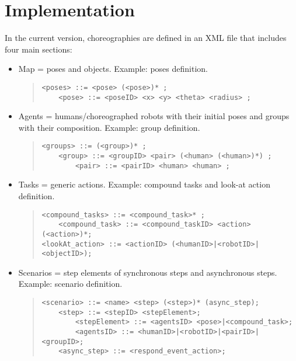 \section{Implementation}
\label{sec:implementation}
In the current version, choreographies are defined in an XML file that includes four main sections:
\begin{itemize}
    \item Map = poses and objects. Example: poses definition.
    {\footnotesize
        \begin{quote}
        \begin{verbatim}
<poses> ::= <pose> (<pose>)* ;
    <pose> ::= <poseID> <x> <y> <theta> <radius> ;
        \end{verbatim}
        \end{quote}
    }
    \item Agents = humans/choreographed robots with their initial poses and groups with their composition. Example: group definition.
    {\footnotesize
        \begin{quote}
        \begin{verbatim}
<groups> ::= (<group>)* ; 
    <group> ::= <groupID> <pair> (<human> (<human>)*) ;
        <pair> ::= <pairID> <human> <human> ;
        \end{verbatim}
        \end{quote}
    }
    \item Tasks = generic actions. Example: compound tasks and look-at action definition.
    {\footnotesize \noindent
        \begin{quote}
        \begin{verbatim}
<compound_tasks> ::= <compound_task>* ;
    <compound_task> ::= <compound_taskID> <action> (<action>)*;
<lookAt_action> ::= <actionID> (<humanID>|<robotID>|<objectID>); 
        \end{verbatim}
        \end{quote}
    }
    \item Scenarios = step elements of synchronous steps and asynchronous steps. Example: scenario definition. 
    {\footnotesize
        \begin{quote}
        \begin{verbatim}
<scenario> ::= <name> <step> (<step>)* (async_step);
    <step> ::= <stepID> <stepElement>; 
        <stepElement> ::= <agentsID> <pose>|<compound_task>;
        <agentsID> ::= <humanID>|<robotID>|<pairID>|<groupID>;
    <async_step> ::= <respond_event_action>;
        \end{verbatim}
        \end{quote}
    }
\end{itemize}

